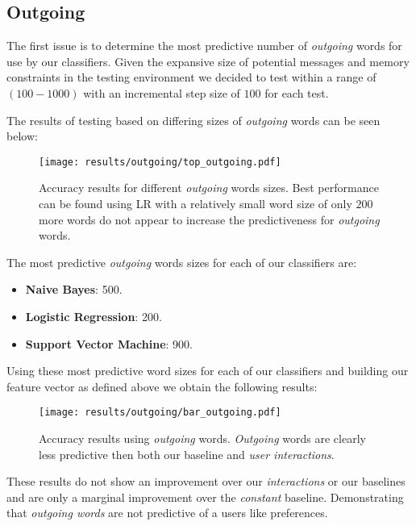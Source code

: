 \subsection{Outgoing}
\label{sec:id}

The first issue is to determine the most predictive number of \emph{outgoing} words for use by our classifiers. 
Given the expansive size of potential messages and memory constraints in the testing environment we decided to test within a range 
of $(100-1000)$ with an incremental step size of $100$ for each test.

The results of testing based on differing sizes of \emph{outgoing} words can be seen below:

\begin{figure}[h]
	\begin{center}
		\texttt{[image: results/outgoing/top\_outgoing.pdf]}
		\caption{Accuracy results for different \emph{outgoing} words sizes. Best performance can be found using LR with a relatively small word size of only $200$ more words do not appear to increase the predictiveness for \emph{outgoing} words.}
	\end{center}
\end{figure}

\clearpage

The most predictive \emph{outgoing} words sizes for each of our classifiers are:
\begin{itemize}
\item \textbf{Naive Bayes}: 500.
\item \textbf{Logistic Regression}: 200.
\item \textbf{Support Vector Machine}: 900.
\end{itemize}

Using these most predictive word sizes for each of our classifiers and building our feature vector as defined above we obtain the following results:

\begin{figure}[h]
	\begin{center}
		\texttt{[image: results/outgoing/bar\_outgoing.pdf]}
		\caption{Accuracy results using \emph{outgoing} words. \emph{Outgoing} words are clearly less predictive then both our baseline and \emph{user interactions}.}
	\end{center}
\end{figure}

These results do not show an improvement over our \emph{interactions} or our baselines and are only a marginal improvement over the \emph{constant} baseline. 
Demonstrating that \emph{outgoing words} are not predictive of a users like preferences.

